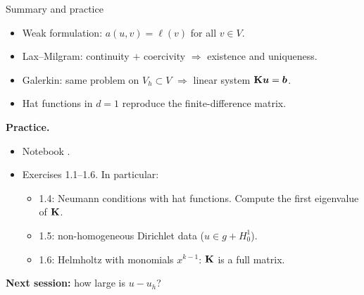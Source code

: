 \begin{frame}{Summary and practice}
    \begin{itemize}
        \item Weak formulation: $a(u,v) = \ell(v)$ for all $v \in V$.
        \item Lax--Milgram: continuity $+$ coercivity $\Rightarrow$ existence and uniqueness.
        \item Galerkin: same problem on $V_h \subset V$ $\Rightarrow$ linear system $\mathbf{K} \bm{u} = \bm{b}$.
        \item Hat functions in $d=1$ reproduce the finite-difference matrix.
    \end{itemize}
    \bigskip
    \textbf{Practice.}
    \begin{itemize}
        \item Notebook .
        \item Exercises 1.1--1.6. In particular:
              \begin{itemize}
                  \item 1.4: Neumann conditions with hat functions. Compute the first eigenvalue of $\mathbf{K}$.
                  \item 1.5: non-homogeneous Dirichlet data ($u \in g + H^1_0$).
                  \item 1.6: Helmholtz with monomials $x^{k-1}$: $\mathbf{K}$ is a full matrix.
              \end{itemize}
    \end{itemize}
    \bigskip
    \textbf{Next session:} how large is $u - u_h$?
\end{frame}
